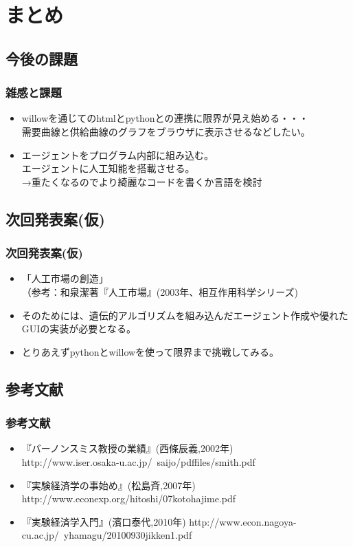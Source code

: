 \documentclass[dvipdfmx,12pt]{beamer}
\begin{document}
\section{まとめ}
\subsection{今後の課題}
\begin{frame}
\frametitle{雑感と課題}
\begin{itemize}\setlength{\parskip}{0.5em}
\item
willowを通じてのhtmlとpythonとの連携に限界が見え始める・・・\\
需要曲線と供給曲線のグラフをブラウザに表示させるなどしたい。\pause
\item
エージェントをプログラム内部に組み込む。\\
エージェントに人工知能を搭載させる。\\
→重たくなるのでより綺麗なコードを書くか言語を検討
\end{itemize}
\end{frame}


\subsection{次回発表案(仮)}
\begin{frame}
\frametitle{次回発表案(仮)}
\begin{itemize}\setlength{\parskip}{0.5em}
\item
「人工市場の創造」\\
\pause
（参考：和泉潔著『人工市場』(2003年、相互作用科学シリーズ)\pause
\item
そのためには、遺伝的アルゴリズムを組み込んだエージェント作成や優れたGUIの実装が必要となる。\pause
\item
とりあえずpythonとwillowを使って限界まで挑戦してみる。
\end{itemize}
\end{frame}

\subsection{参考文献}
\begin{frame}
\frametitle{参考文献}
\begin{itemize}\setlength{\parskip}{0.5em}
\item
『バーノンスミス教授の業績』(西條辰義,2002年)\\
http://www.iser.osaka-u.ac.jp/~saijo/pdffiles/smith.pdf
\item
『実験経済学の事始め』(松島斉,2007年)
http://www.econexp.org/hitoshi/07kotohajime.pdf
\item
『実験経済学入門』(濱口泰代,2010年)
http://www.econ.nagoya-cu.ac.jp/~yhamagu/20100930jikken1.pdf
\end{itemize}
\end{frame}
\end{document}
